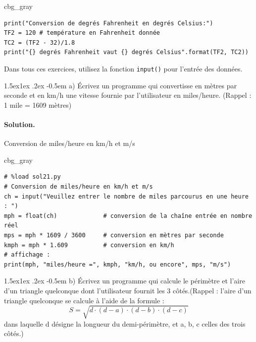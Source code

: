 \documentclass[%
oneside,                 %
final,                   %
10pt,french]{article}
\makeatletter
\newenvironment{_cod_tight}[1]{
   \def\FrameCommand{\colorbox{#1}}
   \FrameRule0.6pt\MakeFramed {\FrameRestore}\vskip3mm}
   {\vskip0mm\endMakeFramed}
\newenvironment{cod}[1]{
\bgroup\rmfamily
\fboxsep=0mm\relax
\begin{_cod_tight}{#1}
\list{}{\parsep=-2mm\parskip=0mm\topsep=0pt\leftmargin=2mm
\rightmargin=2\leftmargin\leftmargin=4pt\relax}
\item\relax}
{\endlist\end{_cod_tight}\egroup}
\newenvironment{doconceexercise}{}{}
\newcounter{doconceexercisecounter}
\newcommand\subex{\@startsection{paragraph}{4}{\z@}%
                  {1.5ex\@plus1ex \@minus.2ex}%
                  {-0.5em}%
                  {\normalfont\normalsize\bfseries}}
\makeatother
\begin{document}
\begin{doconceexercise}
\begin{cod}{cbg_gray}
\begin{verbatim}
print("Conversion de degrés Fahrenheit en degrés Celsius:")
TF2 = 120 # température en Fahrenheit donnée
TC2 = (TF2 - 32)/1.8
print("{} degrés Fahrenheit vaut {} degrés Celsius".format(TF2, TC2))
\end{verbatim}
\end{cod}
\noindent

\end{doconceexercise}




\begin{doconceexercise}



Dans tous ces exercices, utilisez la fonction \texttt{input()} pour l’entrée des données.


\subex{a)}
Écrivez un programme qui convertisse en mètres par seconde et en km/h une vitesse fournie par l’utilisateur en miles/heure. (Rappel : 1 mile = 1609 mètres)


\paragraph{Solution.}
Conversion de miles/heure en km/h et m/s

\begin{cod}{cbg_gray}\begin{verbatim}
# %load sol21.py
# Conversion de miles/heure en km/h et m/s
ch = input("Veuillez entrer le nombre de miles parcourus en une heure : ")
mph = float(ch)             # conversion de la chaîne entrée en nombre réel
mps = mph * 1609 / 3600     # conversion en mètres par seconde
kmph = mph * 1.609          # conversion en km/h
# affichage :
print(mph, "miles/heure =", kmph, "km/h, ou encore", mps, "m/s")
\end{verbatim}
\end{cod}
\noindent

\subex{b)}
Écrivez un programme qui calcule le périmètre et l’aire d’un triangle quelconque dont l’utilisateur fournit les 3 côtés.(Rappel : l’aire d’un triangle quelconque se calcule à l’aide de la formule :
$$ S = \sqrt{d \cdot (d-a) \cdot (d-b) \cdot (d-c)}$$
    dans laquelle d désigne la longueur du demi-périmètre, et a, b, c celles des trois côtés.)



\end{doconceexercise}
\end{document}
